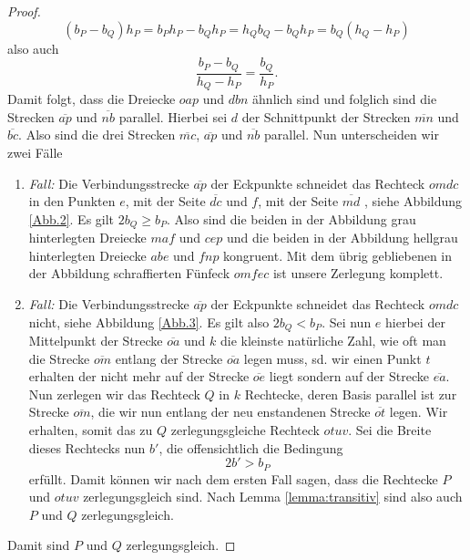 \documentclass[11pt,titlepage]{article}
\theoremstyle{definition}
\theoremstyle{remark}
\begin{document}
\begin{proof}
		\[ (b_P-b_Q)h_P=b_P h_P-b_Q h_P=h_Qb_Q-b_Qh_P=b_Q(h_Q-h_P) \]
		also auch
		\[\frac{b_P-b_Q}{h_Q-h_P}=\frac{b_Q}{h_P}. \]
		Damit folgt, dass die Dreiecke $oap$ und $dbn$ ähnlich sind und folglich sind die Strecken $\overline{ap}$ 
		und $\overline{nb}$ parallel. Hierbei sei $d$ der Schnittpunkt der Strecken $\overline{mn}$ und 
		$\overline{bc}$. Also sind die drei Strecken $\overline{mc}$, $\overline{ap}$ und $\overline{nb}$ 
		parallel. Nun unterscheiden wir zwei Fälle
		\begin{enumerate}
			\item \textsl{Fall:} Die Verbindungsstrecke $\overline{ap}$ der Eckpunkte schneidet das 
			Rechteck $omdc$ in den Punkten $e$, mit der Seite $\overline{dc}$ und $f$, mit der Seite $\overline{md}$ 
			, siehe Abbildung \ref{Abb.2}. Es gilt $2b_Q\geq b_P$.
			Also sind die beiden in der Abbildung grau hinterlegten Dreiecke $maf$ und $cep$ und die beiden 
			in der Abbildung hellgrau hinterlegten Dreiecke $abe$ und $fnp$ kongruent. Mit dem übrig gebliebenen 
			in der Abbildung schraffierten Fünfeck $omfec$ ist unsere Zerlegung komplett.
			
			\item \textsl{Fall:} Die Verbindungsstrecke $\overline{ap}$ der Eckpunkte schneidet das 
			Rechteck $omdc$ nicht, siehe Abbildung \ref{Abb.3}. 
			Es gilt also $2b_Q<b_P$. Sei nun $e$ hierbei der Mittelpunkt der Strecke $\overline{oa}$ und $k$ die 
			kleinste natürliche Zahl, wie oft man die Strecke $\overline{om}$ entlang der Strecke $\overline{oa}$ 
			legen muss, sd. wir einen Punkt $t$ erhalten der nicht mehr auf der Strecke $\overline{oe}$ liegt 
			sondern auf der Strecke $\overline{ea}$. Nun zerlegen wir das Rechteck $Q$ in $k$ Rechtecke, deren 
			Basis parallel ist zur Strecke $\overline{om}$, die wir nun entlang der neu enstandenen Strecke 
			$\overline{ot}$ legen. Wir erhalten, somit das zu $Q$ zerlegungsgleiche Rechteck $otuv$. 
			Sei die Breite dieses Rechtecks nun $b'$, die offensichtlich die Bedingung
			\[ 2b'>b_P \]
			erfüllt. Damit können wir nach dem ersten Fall sagen, dass die Rechtecke $P$ und $otuv$ 
			zerlegungsgleich sind. Nach Lemma \ref{lemma:transitiv} sind also auch $P$ und $Q$ zerlegungsgleich.
		\end{enumerate}
		Damit sind $P$ und $Q$ zerlegungsgleich.
	\end{proof}
	
\end{document}
